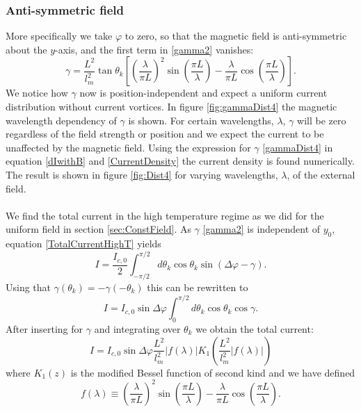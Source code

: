 \subsubsection{Anti-symmetric field}
More specifically we take $\varphi$ to zero, so that the magnetic field is anti-symmetric about the $y$-axis, and the first term in \eqref{gamma2} vanishes:
\begin{equation}
\gamma = \frac{L^2}{l_m^2}\tan\theta_k\left[\left(\frac{\lambda}{\pi L}\right)^2\sin\left(\frac{\pi L}{\lambda}\right)-\frac{\lambda}{\pi L}\cos\left(\frac{\pi L}{\lambda}\right)\right].
\label{gammaDist4}
\end{equation}
We notice how $\gamma$ now is position-independent and expect a uniform current distribution without current vortices. In figure \ref{fig:gammaDist4} the magnetic wavelength dependency of $\gamma$ is shown. For certain wavelengths, $\lambda$, $\gamma$ will be zero regardless of the field strength or position and we expect the current to be unaffected by the magnetic field. Using the expression for $\gamma$ \eqref{gammaDist4} in equation \eqref{dIwithB} and \eqref{CurrentDensity} the current density is found numerically. The result is shown in figure \ref{fig:Dist4} for varying wavelengths, $\lambda$, of the external field.
\\
\\
We find the total current in the high temperature regime as we did for the uniform field in section \ref{sec:ConstField}. As $\gamma$ \eqref{gamma2} is independent of $y_0$, equation \eqref{TotalCurrentHighT} yields
\begin{equation}
I = \frac{I_{c,0}}{2}\int_{-\pi/2}^{\pi/2}d\theta_k\cos\theta_k\sin(\Delta \varphi - \gamma).
\end{equation}
Using that $\gamma(\theta_k) = -\gamma(-\theta_k)$ this can be rewritten to
\begin{equation}
I = I_{c,0}\sin\Delta\varphi\int_0^{\pi/2}d\theta_k\cos\theta_k\cos\gamma.
\end{equation}
After inserting for $\gamma$ and integrating over $\theta_k$ we obtain the total current:
\begin{equation}
I = I_{c,0}\sin\Delta\varphi\frac{L^2}{l_m^2}\left|f(\lambda)\right|K_1\left(\frac{L^2}{l_m^2}\left|f(\lambda)\right|\right)
\end{equation}
where $K_1(z)$ is the modified Bessel function of second kind and we have defined
\begin{equation}
f(\lambda) \equiv \left(\frac{\lambda}{\pi L}\right)^2\sin\left(\frac{\pi L}{\lambda}\right)-\frac{\lambda}{\pi L}\cos\left(\frac{\pi L}{\lambda}\right).
\end{equation}
